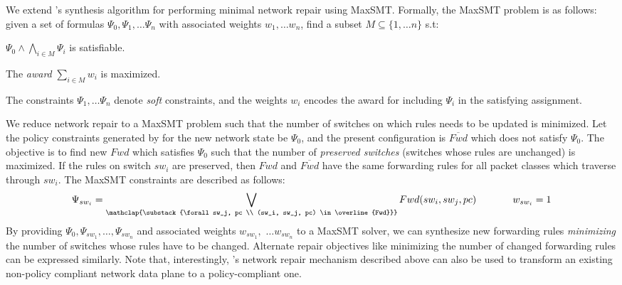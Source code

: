 We extend \name's synthesis algorithm for performing
minimal network repair using MaxSMT.  
Formally, the MaxSMT problem is as follows: given a set
of formulas $\Psi_0, \Psi_1, \ldots \Psi_n$ with associated 
weights $w_1, \ldots w_n$, find a subset $M \subseteq \{1, \ldots n\}$
s.t: 
\begin{compactenumerate}
	\item $\Psi_0 \wedge \bigwedge_{i \in M} \Psi_i$ is satisfiable.
	\item The \emph{award} $\sum_{i \in M} w_i$  is maximized.
\end{compactenumerate}
The constraints $\Psi_1, \ldots \Psi_n$ denote \emph{soft} constraints, and
the weights $w_i$ encodes the award for including $\Psi_i$ in the satisfying
assignment. 

We reduce network repair to a MaxSMT problem
such that 
the number of switches on which rules needs to be updated is minimized.
 Let
the policy constraints generated by \name for the new network state be $\Psi_0$, and the present 
configuration is $\overline{Fwd}$ which does not satisfy $\Psi_0$. The 
objective is to find new $Fwd$ which satisfies $\Psi_0$ such that the number of \emph{preserved switches} (switches whose rules are unchanged) 
is maximized. If the rules on switch $sw_i$ are preserved, then $Fwd$ and $\overline{Fwd}$ have the same forwarding rules for all packet classes which
traverse through $sw_i$. The MaxSMT constraints are described as follows:
\begin{equation}
	\Psi_{sw_i} =  
	  \bigvee_{\mathclap{\substack{\forall sw_j, pc \\
			  		(sw_i, sw_j, pc) \in \overline{Fwd}}}} Fwd(sw_i, sw_j, pc) 
			~~~~~~~~~~~ 
			w_{sw_i}= 1
\end{equation}
By providing $\Psi_0, \Psi_{sw_1}, \ldots, \Psi_{sw_n}$ and associated
weights $w_{sw_1},$ $\ldots w_{sw_n}$ to a MaxSMT solver, we can
synthesize new forwarding rules \emph{minimizing} the number of
switches whose rules have to be changed.  Alternate repair objectives
like minimizing the number of changed forwarding rules can be
expressed similarly. Note that, interestingly, \name's network repair
mechanism described above can also be used to transform an existing
non-policy compliant network data plane to a policy-compliant one.

